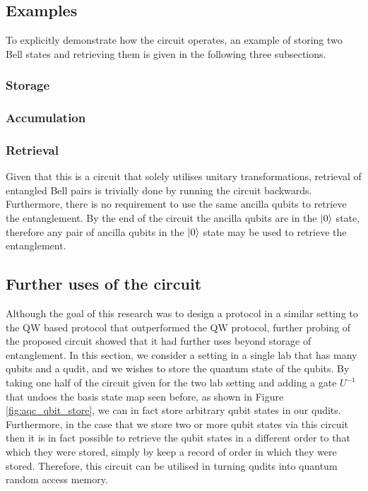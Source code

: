 \subsection{Examples}
\label{subsection:examples}
To explicitly demonstrate how the circuit operates, an example of storing two Bell states and retrieving them is given in the following three subsections.
\subsubsection{Storage}
\label{subsubsection:aqcstorage}

\subsubsection{Accumulation}
\label{subsubsection:accumulation}

\subsubsection{Retrieval}
\label{subsubsection:aqcretrieval}
Given that this is a circuit that solely utilises unitary transformations, retrieval of entangled Bell pairs is trivially done by running the circuit backwards. Furthermore, there is no requirement to use the same ancilla qubits to retrieve the entanglement. By the end of the circuit the ancilla qubits are in the $\ket{0}$ state, therefore any pair of ancilla qubits in the $\ket{0}$ state may be used to retrieve the entanglement.

\subsection{Further uses of the circuit}
\label{subsection:furtheruses}
Although the goal of this research was to design a protocol in a similar setting to the QW based protocol that outperformed the QW protocol, further probing of the proposed circuit showed that it had further uses beyond storage of entanglement.
In this section, we consider a setting in a single lab that has many qubits and a qudit, and we wishes to store the quantum state of the qubits.
By taking one half of the circuit given for the two lab setting and adding a gate $U^{-1}$ that undoes the basis state map seen before, as shown in Figure \ref{fig:aqc_qbit_store}, we can in fact store arbitrary qubit states in our qudits.
Furthermore, in the case that we store two or more qubit states via this circuit then it is in fact possible to retrieve the qubit states in a different order to that which they were stored, simply by keep a record of order in which they were stored.
Therefore, this circuit can be utilised in turning qudits into quantum random access memory.


